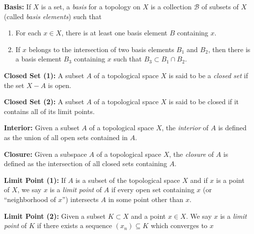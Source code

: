 \documentclass[12pt, a4paper]{article}
\begin{document}
\textbf{Basis:} If $X$ is a set, a \textit{basis} for a topology on $X$ is a collection $\mathcal{B}$ of subsets of $X$ (called \textit{basis elements}) such that

\begin{enumerate}[label=(\arabic*)]
    \item For each $x\in X$, there is at least one basis element $B$ containing $x$.
    \item If $x$ belongs to the intersection of two basis elements $B_1$ and $B_2$, then there is a basis element $B_3$ containing $x$ such that $B_3\subset B_1\cap B_2$.
\end{enumerate}

\vspace{4mm}\par

\textbf{Closed Set (1):} A subset $A$ of a topological space $X$ is said to be a \textit{closed set} if the set $X-A$ is open.

\vspace{4mm}\par

\textbf{Closed Set (2):} A subset $A$ of a topological space $X$ is said to be closed if it contains all of its limit points.

\vspace{4mm}\par

\textbf{Interior:} Given a subset $A$ of a topological space $X$, the \textit{interior} of $A$ is defined as the union of all open sets contained in $A$.

\vspace{4mm}\par

\textbf{Closure:} Given a subspace $A$ of a topological space $X$, the \textit{closure} of $A$ is defined as the intersection of all closed sets containing $A$.

\vspace{4mm}\par

\textbf{Limit Point (1):} If $A$ is a subset of the topological space $X$ and if $x$ is a point of $X$, we say $x$ is a \textit{limit point} of $A$ if every open set containing $x$ (or ``neighborhood of $x$'') intersects $A$ in some point other than $x$.

\vspace{4mm}\par

\textbf{Limit Point (2):} Given a subset $K\subset X$ and a point $x\in X$. We say $x$ is a \textit{limit point} of $K$ if there exists a sequence $(x_n)\subseteq K$ which converges to $x$
\end{document}
